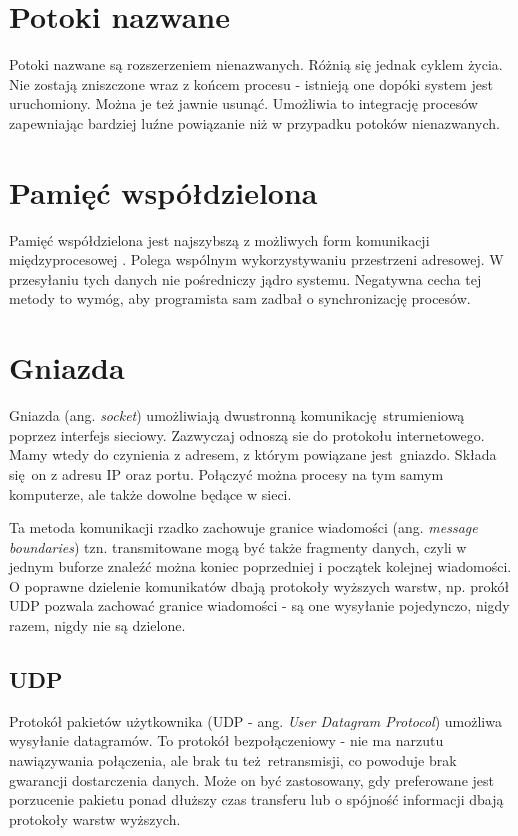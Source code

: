 \section{Potoki nazwane}

Potoki nazwane są rozszerzeniem nienazwanych. Różnią się jednak cyklem życia. Nie zostają zniszczone wraz z końcem procesu - istnieją one dopóki system jest uruchomiony. Można je też jawnie usunąć. Umożliwia to integrację procesów zapewniając bardziej luźne powiązanie niż w przypadku potoków nienazwanych.


\section{Pamięć współdzielona}

Pamięć współdzielona jest najszybszą z możliwych form komunikacji międzyprocesowej \cite{Ste92}. Polega wspólnym wykorzystywaniu przestrzeni adresowej. W przesyłaniu tych danych nie pośredniczy jądro systemu. Negatywna cecha tej metody to wymóg, aby programista sam zadbał o synchronizację procesów.


\section{Gniazda}

Gniazda (ang. \textit{socket}) umożliwiają dwustronną komunikację strumieniową poprzez interfejs sieciowy. Zazwyczaj odnoszą sie do protokołu internetowego. Mamy wtedy do czynienia z adresem, z którym powiązane jest gniazdo. Składa się on z adresu IP oraz portu. Połączyć można procesy na tym samym komputerze, ale także dowolne będące w sieci. 

Ta metoda komunikacji rzadko zachowuje granice wiadomości (ang. \textit{message boundaries}) tzn. transmitowane mogą być także fragmenty danych, czyli w jednym buforze znaleźć można koniec poprzedniej i początek kolejnej wiadomości. O poprawne dzielenie komunikatów dbają protokoły wyższych warstw, np. prokół UDP pozwala zachować granice wiadomości - są one wysyłanie pojedynczo, nigdy razem, nigdy nie są dzielone.


\subsection{UDP}

Protokół pakietów użytkownika (UDP - ang. \textit{User Datagram Protocol}) umożliwa wysyłanie datagramów. To protokół bezpołączeniowy - nie ma narzutu nawiązywania połączenia, ale brak tu też retransmisji, co powoduje brak gwarancji dostarczenia danych. Może on być zastosowany, gdy preferowane jest porzucenie pakietu ponad dłuższy czas transferu lub o spójność informacji dbają protokoły warstw wyższych.


